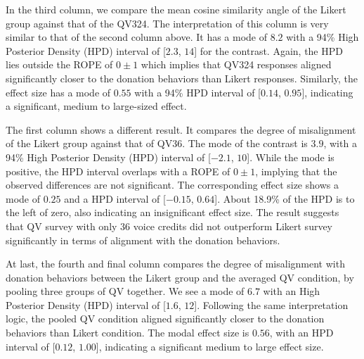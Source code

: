 In the third column, we compare the mean cosine similarity angle of the Likert group
against that of the QV324. The interpretation of this column is very similar to that of the second column above. It has a mode of $8.2$ with a 94\% High Posterior Density (HPD) interval of [$2.3$, $14$] for the contrast. Again, the HPD lies outside the ROPE of $0 \pm 1$ which implies that QV324 responses aligned significantly closer to the donation behaviors than Likert responses. Similarly, the effect size has a mode of $0.55$ with a 94\% HPD interval of [$0.14$, $0.95$], indicating a significant, medium to large-sized effect.

The first column shows a different result. It compares the degree of misalignment of the Likert group against that of QV36. The mode of the contrast is $3.9$, with a 94\% High Posterior Density (HPD) interval of [$-2.1$, $10$]. While the mode is positive, the HPD interval overlaps with a ROPE of $0 \pm 1$, implying that the observed differences are not significant. The corresponding effect size shows a mode of $0.25$ and a HPD interval of [$-0.15$, $0.64$]. About 18.9\% of the HPD is to the left of zero, also indicating an insignificant effect size. The result suggests that QV survey with only 36 voice credits did not outperform Likert survey significantly in terms of alignment with the donation behaviors.

At last, the fourth and final column compares the degree of misalignment with donation behaviors between the Likert group and the averaged QV condition, by pooling three groups of QV together. We see a mode of $6.7$ with an High Posterior Density (HPD) interval of [$1.6$, $12$]. Following the same interpretation logic, the pooled QV condition aligned significantly closer to the donation behaviors than Likert condition. The modal effect size is $0.56$, with an HPD interval of [$0.12$, $1.00$], indicating a significant medium to large effect size.


